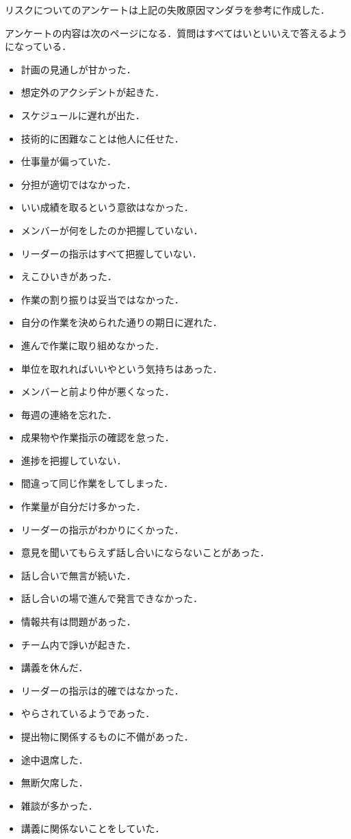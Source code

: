リスクについてのアンケートは上記の失敗原因マンダラ\cite{110009915588}を参考に作成した．

アンケートの内容は次のページになる．質問はすべてはいといいえで答えるようになっている．
 \newpage
\begin{itemize}
\item 計画の見通しが甘かった．
\item 想定外のアクシデントが起きた．
\item スケジュールに遅れが出た．
\item 技術的に困難なことは他人に任せた．
\item 仕事量が偏っていた．
\item 分担が適切ではなかった．
\item いい成績を取るという意欲はなかった．
\item メンバーが何をしたのか把握していない．
\item リーダーの指示はすべて把握していない．
\item えこひいきがあった．
\item 作業の割り振りは妥当ではなかった．
\item 自分の作業を決められた通りの期日に遅れた．
\item 進んで作業に取り組めなかった．
\item 単位を取れればいいやという気持ちはあった．
\item メンバーと前より仲が悪くなった．
\item 毎週の連絡を忘れた．
\item 成果物や作業指示の確認を怠った．
\item 進捗を把握していない．
\item 間違って同じ作業をしてしまった．
\item 作業量が自分だけ多かった．
\item リーダーの指示がわかりにくかった．
\item 意見を聞いてもらえず話し合いにならないことがあった．
\item 話し合いで無言が続いた．
\item 話し合いの場で進んで発言できなかった．
\item 情報共有は問題があった．
\item チーム内で諍いが起きた．
\item 講義を休んだ．
\item リーダーの指示は的確ではなかった．
\item やらされているようであった．
\item 提出物に関係するものに不備があった．
\item 途中退席した．
\item 無断欠席した．
\item 雑談が多かった．
\item 講義に関係ないことをしていた．
\end{itemize} 


